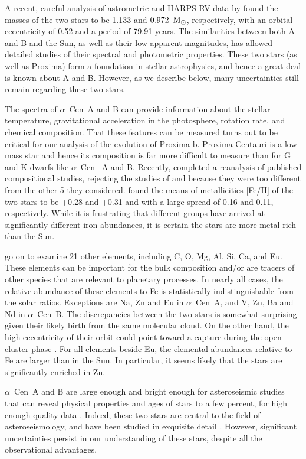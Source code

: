 \documentclass[preprint,12pt]{aastex}
\def\msun{{\rm\,M_\odot}}
\def\eg{{\it e.g.\ }}
\def\acen{{$\alpha$~Cen}}
\begin{document}
A recent, careful analysis of astrometric and HARPS RV data by
\cite{PourbaixBoffin16} found the masses of the two stars to be 1.133
and $0.972~\msun$, respectively, with an orbital eccentricity of 0.52
and a period of 79.91 years. The similarities between both A and B and
the Sun, as well as their low apparent magnitudes, has allowed
detailed studies of their spectral and photometric properties. These
two stars (as well as Proxima) form a foundation in stellar astrophysics,
and hence a great deal is known about A and B. However, as we describe
below, many uncertainties still remain regarding these two stars.

The spectra of \acen~A and B can provide information about the stellar
temperature, gravitational acceleration in the photosphere, rotation
rate, and chemical composition. That these features can be measured turns out
to be critical for our analysis of the evolution of Proxima b. Proxima
Centauri is a low mass star and hence its composition is far more
difficult to measure than for G and K dwarfs like \acen~ A and
B. Recently, \cite{HinkelKane13} completed a reanalysis of published
compositional studies, rejecting the studies of \cite{Laird85} and
\cite{NeuforgeMagain97} because they were too different from the
other 5 they considered. \cite{HinkelKane13} found the means of metallicities [Fe/H]
of the two stars to be +0.28 and +0.31 and with a large spread of 0.16
and 0.11, respectively. While it is frustrating that different groups
have arrived at significantly different iron abundances, it is certain
the stars are more metal-rich than the Sun. 

\cite{HinkelKane13} go on to examine 21 other elements, including C,
O, Mg, Al, Si, Ca, and Eu. These elements can be important for the
bulk composition and/or are tracers of other species that are relevant
to planetary processes. In nearly all cases, the relative abundance of
these elements to Fe is statistically indistinguishable from the solar
ratios. Exceptions are Na, Zn and Eu in \acen~A, and V, Zn, Ba
and Nd in \acen~B. The discrepancies between the two stars is
somewhat surprising given their likely birth from the same molecular
cloud. On the other hand, the high eccentricity of their orbit could
point toward a capture during the open cluster phase \citep[\eg][]{Malmberg07}. For all
elements beside Eu, the elemental abundances relative to Fe are larger
than in the Sun. In particular, it seems likely that the stars are
significantly enriched in Zn.

\acen~A and B are large enough and bright enough for asteroseismic
studies that can reveal physical properties and ages of stars to a few
percent, for high enough quality data \citep{Kjeldsen95}. Indeed,
these two stars are central to the field of asteroseismology, and have
been studied in exquisite detail
\citep[e.g.][]{Bouchy01,Bouchy02}. However, significant uncertainties
persist in our understanding of these stars, despite all the
observational advantages.
\end{document}
